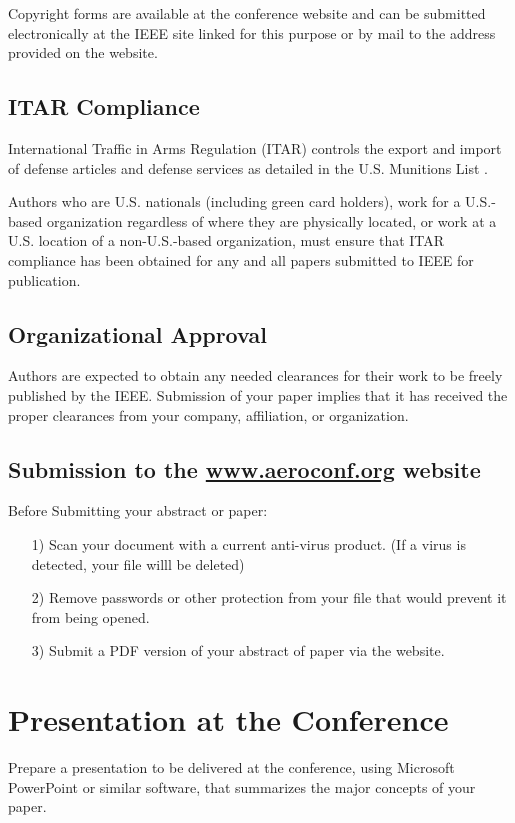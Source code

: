 \documentclass[twocolumn,letterpaper]{IEEEAerospaceCLS}  %
\begin{document}
Copyright forms are available at the conference website and can be submitted electronically at the IEEE site linked for this purpose or by mail to the address provided on the website.

\subsection{ITAR Compliance}
International Traffic in Arms Regulation (ITAR) controls the export and import of defense articles and defense services as detailed in the U.S. Munitions List \cite{ITAR}.

Authors who are U.S. nationals (including green card holders), work for a U.S.-based organization regardless of where they are physically located, or work at a U.S. location of a non-U.S.-based organization, must ensure that ITAR compliance has been obtained for any and all papers submitted to IEEE for publication.

\subsection{Organizational Approval}
Authors are expected to obtain any needed clearances for their work to be freely published by the IEEE. Submission of your paper implies that it has received the proper clearances from your company, affiliation, or organization.

\subsection{Submission to the \underline{www.aeroconf.org} website}
Before Submitting your abstract or paper:
\begin{itemize}
  \item [1)] Scan your document with a current anti-virus product. (If a virus is detected, your file willl be deleted) \\
  \item [2)] Remove passwords or other protection from your file that would prevent it from being opened. \\
  \item [3)] Submit a PDF version of your abstract of paper via the website.
\end{itemize}

\section{Presentation at the Conference}
Prepare a presentation to be delivered at the conference, using Microsoft PowerPoint or similar software, that summarizes the major concepts of your paper.
\end{document}

